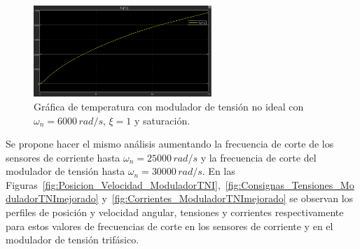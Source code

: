 \documentclass{article}
\begin{document}
\begin{figure}[H]
    \centering
    \includegraphics[width=0.6\textwidth]{Imagenes/Temperatura_Estator_ModuladorTNI.png}
    \caption{Gráfica de temperatura con modulador de tensión no ideal con \(\omega_n = 6000\,rad/s\), \(\xi = 1\) y saturación.}
    \label{fig:Temperatura_Estator_ModuladorTNI}
\end{figure}

Se propone hacer el mismo análisis aumentando la frecuencia de corte de los sensores de corriente hasta \(\omega_n = 25000\,rad/s\) y la frecuencia de corte del modulador de tensión hasta \(\omega_n = 30000\,rad/s\). En las Figuras~\ref{fig:Posicion_Velocidad_ModuladorTNI},~\ref{fig:Consignas_Tensiones_ModuladorTNImejorado} y~\ref{fig:Corrientes_ModuladorTNImejorado} se observan los perfiles de posición y velocidad angular, tensiones y corrientes respectivamente para estos valores de frecuencias de corte en los sensores de corriente y en el modulador de tensión trifásico.
\end{document}
